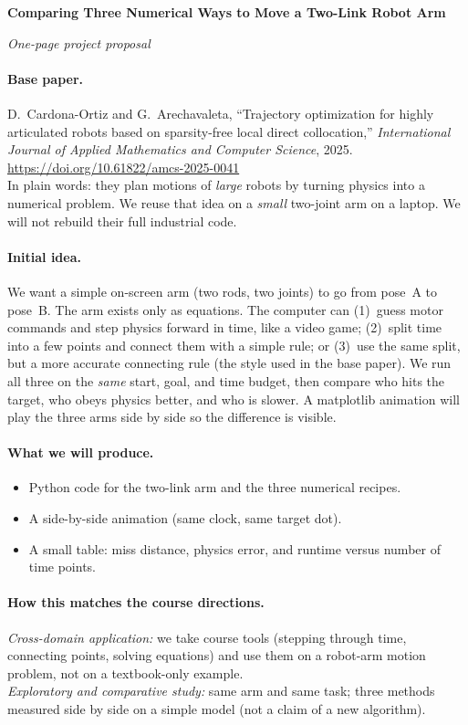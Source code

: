 \documentclass[11pt,a4paper]{article}
\begin{document}
{\Large\bfseries Comparing Three Numerical Ways to Move a Two-Link Robot Arm\par}
\vspace{0.15em}
{\small\textit{One-page project proposal}}

\paragraph{Base paper.}
D.~Cardona-Ortiz and G.~Arechavaleta,
``Trajectory optimization for highly articulated robots based on sparsity-free local direct collocation,''
\textit{International Journal of Applied Mathematics and Computer Science}, 2025.
\url{https://doi.org/10.61822/amcs-2025-0041}\\[0.2em]
In plain words: they plan motions of \emph{large} robots by turning physics into a numerical problem.
We reuse that idea on a \emph{small} two-joint arm on a laptop. We will not rebuild their full industrial code.

\paragraph{Initial idea.}
We want a simple on-screen arm (two rods, two joints) to go from pose~A to pose~B.
The arm exists only as equations. The computer can (1)~guess motor commands and step physics forward in time, like a video game;
(2)~split time into a few points and connect them with a simple rule; or
(3)~use the same split, but a more accurate connecting rule (the style used in the base paper).
We run all three on the \emph{same} start, goal, and time budget, then compare who hits the target, who obeys physics better, and who is slower.
A matplotlib animation will play the three arms side by side so the difference is visible.

\paragraph{What we will produce.}
\begin{itemize}
  \item Python code for the two-link arm and the three numerical recipes.
  \item A side-by-side animation (same clock, same target dot).
  \item A small table: miss distance, physics error, and runtime versus number of time points.
\end{itemize}

\paragraph{How this matches the course directions.}
\textit{Cross-domain application:} we take course tools (stepping through time, connecting points, solving equations) and use them on a robot-arm motion problem, not on a textbook-only example.\\[0.25em]
\textit{Exploratory and comparative study:} same arm and same task; three methods measured side by side on a simple model (not a claim of a new algorithm).
\end{document}
